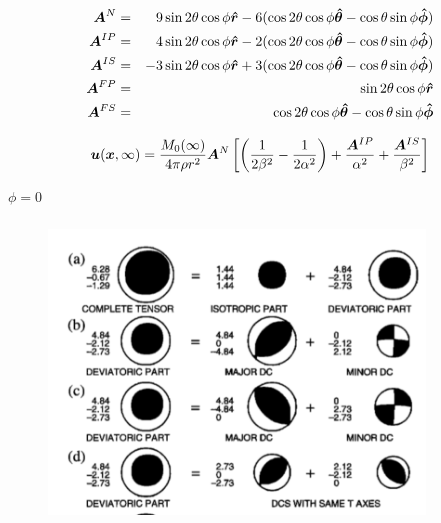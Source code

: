\documentclass{beamer}
\begin{document}
\begin{frame}
\begin{eqnarray}
\boldsymbol{A}^{N} &=& 9\sin2\theta \cos\phi \boldsymbol{\hat{r}}-6(\cos 2\theta\cos \phi \boldsymbol{\hat{\theta}}-\cos \theta \sin \phi \boldsymbol{\hat{\phi}})\nonumber \\
\boldsymbol{A}^{IP} &=& 4\sin2\theta \cos\phi \boldsymbol{\hat{r}}-2(\cos 2\theta\cos \phi \boldsymbol{\hat{\theta}}-\cos \theta \sin \phi \boldsymbol{\hat{\phi}})\nonumber \\
\boldsymbol{A}^{IS} &=& -3\sin2\theta \cos\phi \boldsymbol{\hat{r}}+3(\cos 2\theta\cos \phi \boldsymbol{\hat{\theta}}-\cos \theta \sin \phi \boldsymbol{\hat{\phi}})\nonumber \\
\boldsymbol{A}^{FP} &=& \sin2\theta \cos\phi \boldsymbol{\hat{r}} \nonumber \\
\boldsymbol{A}^{FS} &=& \cos 2\theta\cos \phi \boldsymbol{\hat{\theta}}-\cos \theta \sin \phi \boldsymbol{\hat{\phi}}\nonumber 
\end{eqnarray}	
\end{frame}

\begin{frame}
\begin{equation}
\boldsymbol{u}(\boldsymbol{x},\infty) =\frac{M_0(\infty)}{4\pi\rho  r^2} \boldsymbol{A}^{N}\left[\left(\frac{1}{2\beta^2}-\frac{1}{2\alpha^2}\right)+\frac{\boldsymbol{A}^{IP}}{\alpha^2}+\frac{\boldsymbol{A}^{IS}}{\beta^2}\right] \nonumber
\end{equation}
\end{frame}


\begin{frame}{$\phi = 0$}
	\begin{figure}[htb]
		\centering
		\includegraphics[width= 10cm, height= 8cm]{fig31}
	\end{figure}
\end{frame}
\end{document}

